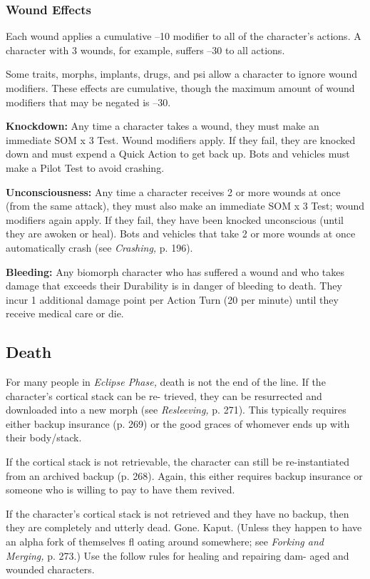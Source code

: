 \subsubsection{Wound Effects}

Each wound applies a cumulative –10 modifier to all 
of the character's actions. A character with 3 wounds, 
for example, suffers –30 to all actions.

Some traits, morphs, implants, drugs, and psi allow 
a character to ignore wound modifiers. These effects 
are cumulative, though the maximum amount of 
wound modifiers that may be negated is –30.

\textbf{Knockdown:} Any time a character takes a wound, 
they must make an immediate SOM x 3 Test. Wound 
modifiers apply. If they fail, they are knocked down 
and must expend a Quick Action to get back up. Bots 
and vehicles must make a Pilot Test to avoid crashing.

\textbf{Unconsciousness:} Any time a character receives 2 
or more wounds at once (from the same attack), they 
must also make an immediate SOM x 3 Test; wound 
modifiers again apply. If they fail, they have been 
knocked unconscious (until they are awoken or heal). 
Bots and vehicles that take 2 or more wounds at once 
automatically crash (see \textit{Crashing,} p. 196).

\textbf{Bleeding:} Any biomorph character who has suffered 
a wound and who takes damage that exceeds their 
Durability is in danger of bleeding to death. They 
incur 1 additional damage point per Action Turn (20 
per minute) until they receive medical care or die.

\subsection{Death}

For many people in \textit{Eclipse Phase,} death is not the end 
of the line. If the character's cortical stack can be re-
trieved, they can be resurrected and downloaded into 
a new morph (see \textit{Resleeving,} p. 271). This typically 
requires either backup insurance (p. 269) or the good 
graces of whomever ends up with their body/stack.

If the cortical stack is not retrievable, the character can 
still be re-instantiated from an archived backup (p. 268). 
Again, this either requires backup insurance or someone 
who is willing to pay to have them revived.

If the character's cortical stack is not retrieved 
and they have no backup, then they are completely 
and utterly dead. Gone. Kaput. (Unless they happen 
to have an alpha fork of themselves fl oating around 
somewhere; see \textit{Forking and Merging,} p. 273.)
Use the follow rules for healing and repairing dam-
aged and wounded characters.

